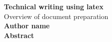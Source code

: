 \documentclass[10pt,a4paper]{article}
\begin{document}
\begin{center}
    

\large
\textbf{Technical writing using latex}\\
\large
\vspace{0.4cm}
\large
Overview of document preparation\\
\large
\vspace{0.4cm}
\textbf{Author name}\\
\vspace{0.4cm}
\textbf{Abstract}\\
\end{center}
\lipsum[1]
\end{document}

